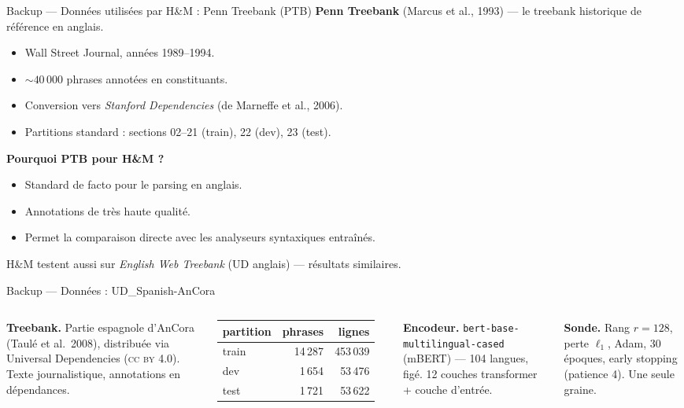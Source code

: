 \documentclass[aspectratio=169,11pt]{beamer}
\begin{document}
\begin{frame}{Backup --- Données utilisées par H\&M : Penn Treebank (PTB)}
  \textbf{Penn Treebank} (Marcus et al., 1993) --- le treebank
  historique de référence en anglais.
  \begin{itemize}\setlength\itemsep{3pt}
    \item Wall Street Journal, années 1989--1994.
    \item ${\sim}40\,000$ phrases annotées en constituants.
    \item Conversion vers \emph{Stanford Dependencies} (de Marneffe et al., 2006).
    \item Partitions standard : sections 02--21 (train), 22 (dev), 23 (test).
  \end{itemize}

  \vspace{0.4cm}
  \textbf{Pourquoi PTB pour H\&M ?}
  \begin{itemize}\setlength\itemsep{2pt}
    \item Standard de facto pour le parsing en anglais.
    \item Annotations de très haute qualité.
    \item Permet la comparaison directe avec les analyseurs syntaxiques entraînés.
  \end{itemize}

  \vspace{0.3cm}
  \footnotesize
  H\&M testent aussi sur \emph{English Web Treebank} (UD anglais) ---
  résultats similaires.
\end{frame}

\begin{frame}{Backup --- Données : UD\_Spanish-AnCora}
  \begin{columns}[T]
    \textbf{Treebank.} Partie espagnole d'AnCora
    (Taulé et al.\ 2008), distribuée via Universal Dependencies
    (\textsc{cc by} 4.0). Texte journalistique, annotations en
    dépendances.

    \vspace{0.4cm}
    \begin{tabular}{lrr}
      \toprule
      partition & phrases & lignes \\
      \midrule
      train & 14\,287 & 453\,039 \\
      dev   &  1\,654 &  53\,476 \\
      test  &  1\,721 &  53\,622 \\
      \bottomrule
    \end{tabular}

    \footnotesize
    \textbf{Encodeur.} \texttt{bert-base-multilingual-cased} (mBERT) ---
    104 langues, figé. 12 couches transformer + couche d'entrée.

    \medskip
    \textbf{Sonde.} Rang $r{=}128$, perte $\ell_1$, Adam, 30 époques,
    early stopping (patience 4). Une seule graine.

  \end{columns}
\end{frame}
\end{document}
